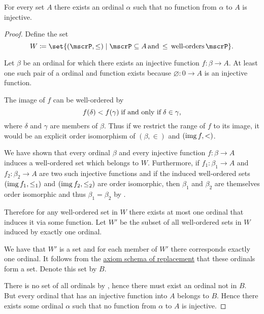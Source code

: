 \begin{theorem}\label{thm:hartogs_lemma}
  For every set \( A \) there exists an ordinal \( \alpha \) such that no function from \( \alpha \) to \( A \) is injective.
\end{theorem}
\begin{proof}
  Define the set
  \begin{equation*}
    W \coloneqq \set{ (\mscrP, \leq) \given \mscrP \subseteq A \T*{and} \leq \T*{well-orders} \mscrP }.
  \end{equation*}

  Let \( \beta \) be an ordinal for which there exists an injective function \( f: \beta \to A \). At least one such pair of a ordinal and function exists because \( \varnothing: 0 \to A \) is an injective function.

  The image of \( f \) can be well-ordered by
  \begin{equation*}
    f(\delta) < f(\gamma) \T{if and only if} \delta \in \gamma,
  \end{equation*}
  where \( \delta \) and \( \gamma \) are members of \( \beta \). Thus if we restrict the range of \( f \) to its image, it would be an explicit order isomorphism of \( (\beta, \in) \) and \( (\operatorname{img} f, <) \).

  We have shown that every ordinal \( \beta \) and every injective function \( f: \beta \to A \) induces a well-ordered set which belongs to \( W \). Furthermore, if \( f_1: \beta_1 \to A \) and \( f_2: \beta_2 \to A \) are two such injective functions and if the induced well-ordered sets \( (\operatorname{img} f_1, \leq_1) \) and \( (\operatorname{img} f_2, \leq_2) \) are order isomorphic, then \( \beta_1 \) and \( \beta_2 \) are themselves order isomorphic and thus \( \beta_1 = \beta_2 \) by .

  Therefore for any well-ordered set in \( W \) there exists at most one ordinal that induces it via some function. Let \( W' \) be the subset of all well-ordered sets in \( W \) induced by exactly one ordinal.

  We have that \( W' \) is a set and for each member of \( W' \) there corresponds exactly one ordinal. It follows from the \hyperref[def:zfc/replacement]{axiom schema of replacement} that these ordinals form a set. Denote this set by \( B \).

  There is no set of all ordinals by , hence there must exist an ordinal not in \( B \). But every ordinal that has an injective function into \( A \) belongs to \( B \). Hence there exists some ordinal \( \alpha \) such that no function from \( \alpha \) to \( A \) is injective.
\end{proof}

